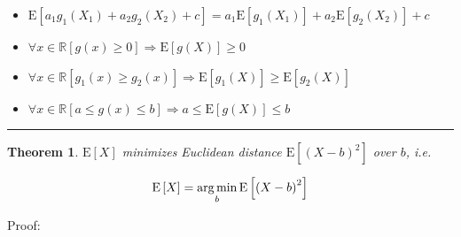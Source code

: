 \documentclass[
]{book}
\providecommand{\tightlist}{%
  \setlength{\itemsep}{0pt}\setlength{\parskip}{0pt}}
\newtheorem{theorem}{Theorem}[chapter]
\theoremstyle{definition}
\theoremstyle{definition}
\theoremstyle{definition}
\theoremstyle{definition}
\theoremstyle{remark}
\begin{document}
\begin{itemize}
\tightlist
\item
  \(\mathrm{E}\left[a_{{\scriptscriptstyle 1}}g_{{\scriptscriptstyle 1}}\left(X_{{\scriptscriptstyle 1}}\right)+a_{{\scriptscriptstyle 2}}g_{{\scriptscriptstyle 2}}\left(X_{{\scriptscriptstyle 2}}\right)+c\right]=a_{{\scriptscriptstyle 1}}\mathrm{E}\left[g_{{\scriptscriptstyle 1}}\left(X_{{\scriptscriptstyle 1}}\right)\right]+a_{{\scriptscriptstyle 2}}\mathrm{E}\left[g_{{\scriptscriptstyle 2}}\left(X_{{\scriptscriptstyle 2}}\right)\right]+c\)
\item
  \(\forall x\in\mathbb{R}\left[g\left(x\right)\ge0\right]\Rightarrow\mathrm{E}\left[g\left(X\right)\right]\ge0\)
\item
  \(\forall x\in\mathbb{R}\left[g_{{\scriptscriptstyle 1}}\left(x\right)\ge g_{{\scriptscriptstyle 2}}\left(x\right)\right]\Rightarrow\mathrm{E}\left[g_{{\scriptscriptstyle 1}}\left(X\right)\right]\ge\mathrm{E}\left[g_{{\scriptscriptstyle 2}}\left(X\right)\right]\)
\item
  \(\forall x\in\mathbb{R}\left[a\le g\left(x\right)\le b\right]\Rightarrow a\le\mathrm{E}\left[g\left(X\right)\right]\le b\)
\end{itemize}

\begin{center}\rule{0.5\linewidth}{0.5pt}\end{center}

\begin{theorem}
\protect\hypertarget{thm:unnamed-chunk-20}{}\label{thm:unnamed-chunk-20}\(\mathrm{E}\left[X\right]\) minimizes Euclidean distance \(\mathrm{E}\left[\left(X-b\right)^{2}\right]\) over \(b\), i.e.
\end{theorem}

\[
\mathrm{E}\left[X\right]=\underset{b}{\arg\min}\thinspace\mathrm{E}\left[\left(X-b\right)^{2}\right]
\]

Proof:
\end{document}
